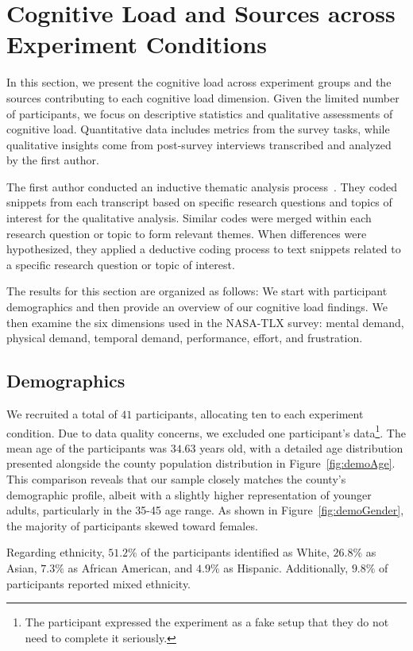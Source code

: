 \section{Cognitive Load and Sources across Experiment Conditions}
\label{sec:cog_result}
In this section, we present the cognitive load across experiment groups and the sources contributing to each cognitive load dimension. Given the limited number of participants, we focus on descriptive statistics and qualitative assessments of cognitive load. Quantitative data includes metrics from the survey tasks, while qualitative insights come from post-survey interviews transcribed and analyzed by the first author.

The first author conducted an inductive thematic analysis process~\cite{olsonWaysKnowingHCI2014}. They coded snippets from each transcript based on specific research questions and topics of interest for the qualitative analysis. Similar codes were merged within each research question or topic to form relevant themes. When differences were hypothesized, they applied a deductive coding process to text snippets related to a specific research question or topic of interest.

The results for this section are organized as follows: We start with participant demographics and then provide an overview of our cognitive load findings. We then examine the six dimensions used in the NASA-TLX survey: mental demand, physical demand, temporal demand, performance, effort, and frustration.

\subsection{Demographics}
We recruited a total of $41$ participants, allocating ten to each experiment condition. Due to data quality concerns, we excluded one participant's data\footnote{The participant expressed the experiment as a fake setup that they do not need to complete it seriously.}. The mean age of the participants was $34.63$ years old, with a detailed age distribution presented alongside the county population distribution in Figure~\ref{fig:demoAge}. This comparison reveals that our sample closely matches the county's demographic profile, albeit with a slightly higher representation of younger adults, particularly in the 35-45 age range. As shown in Figure~\ref{fig:demoGender}, the majority of participants skewed toward females.

Regarding ethnicity, $51.2\%$ of the participants identified as White, $26.8\%$ as Asian, $7.3\%$ as African American, and $4.9\%$ as Hispanic. Additionally, $9.8\%$ of participants reported mixed ethnicity.

